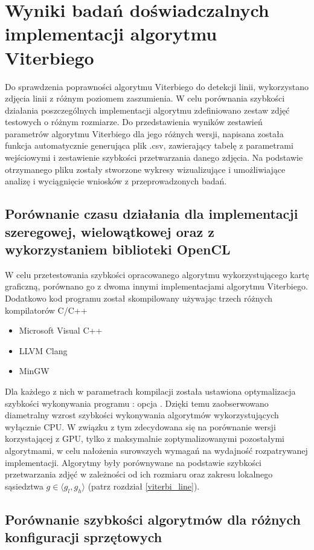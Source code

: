 \documentclass[document.tex]{subfiles}
\begin{document}
\chapter{Wyniki badań doświadczalnych \\ implementacji algorytmu Viterbiego}
\indent Do sprawdzenia poprawności algorytmu Viterbiego do detekcji linii, wykorzystano
zdjęcia linii z różnym poziomem zaszumienia. W celu porównania szybkości
działania poszczególnych implementacji algorytmu zdefiniowano zestaw zdjęć testowych
o różnym rozmiarze. Do przedstawienia wyników zestawień parametrów algorytmu Viterbiego
dla jego różnych wersji, napisana została funkcja automatycznie generująca plik .csv,
zawierający tabelę z parametrami wejściowymi i zestawienie szybkości przetwarzania danego zdjęcia.
Na podstawie otrzymanego pliku zostały stworzone wykresy wizualizujące i umożliwiające
analizę i wyciągnięcie wniosków z przeprowadzonych badań.




\section{Porównanie czasu działania dla implementacji szeregowej, wielowątkowej
oraz z wykorzystaniem biblioteki OpenCL}
\indent W celu przetestowania szybkości opracowanego algorytmu wykorzystującego
kartę graficzną, porównano go z dwoma innymi implementacjami algorytmu Viterbiego.
Dodatkowo kod programu został skompilowany używając trzech różnych kompilatorów C/C++
\begin{itemize}
    \item Microsoft Visual C++
    \item LLVM Clang
    \item MinGW
\end{itemize}
Dla każdego z nich w parametrach kompilacji została ustawiona optymalizacja szybkości
wykonywania programu : opcja . Dzięki temu zaobserwowano diametralny wzrost
szybkości wykonywania algorytmów wykorzystujących wyłącznie CPU. W związku z tym 
zdecydowana się na porównanie wersji korzystającej z GPU, tylko z maksymalnie
zoptymalizowanymi pozostałymi algorytmami, w celu nałożenia surowszych wymagań
na wydajność rozpatrywanej implementacji.
\indent Algorytmy były porównywane na podstawie szybkości przetwarzania zdjęć
w zależności od ich rozmiaru oraz zakresu lokalnego sąsiedztwa $g\in \langle g_l, g_h \rangle$
(patrz rozdział \ref{viterbi_line}). 



\section{Porównanie szybkości algorytmów dla różnych konfiguracji sprzętowych}
\end{document}
